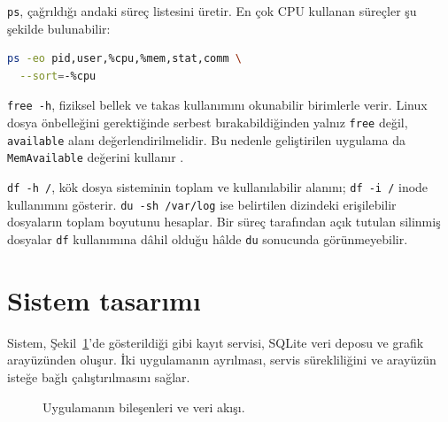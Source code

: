 \documentclass[9pt,a4paper,twocolumn]{extarticle}
\begin{document}
\texttt{ps}, çağrıldığı andaki süreç listesini üretir. En çok CPU kullanan süreçler şu şekilde bulunabilir:

\begin{lstlisting}[language=bash]
ps -eo pid,user,%cpu,%mem,stat,comm \
  --sort=-%cpu
\end{lstlisting}

\texttt{free -h}, fiziksel bellek ve takas kullanımını okunabilir birimlerle verir. Linux dosya önbelleğini gerektiğinde serbest bırakabildiğinden yalnız \texttt{free} değil, \texttt{available} alanı değerlendirilmelidir. Bu nedenle geliştirilen uygulama da \texttt{MemAvailable} değerini kullanır \cite{procman}.

\texttt{df -h /}, kök dosya sisteminin toplam ve kullanılabilir alanını; \texttt{df -i /} inode kullanımını gösterir. \texttt{du -sh /var/log} ise belirtilen dizindeki erişilebilir dosyaların toplam boyutunu hesaplar. Bir süreç tarafından açık tutulan silinmiş dosyalar \texttt{df} kullanımına dâhil olduğu hâlde \texttt{du} sonucunda görünmeyebilir.

\section{Sistem tasarımı}

Sistem, Şekil~\ref{fig:mimari}'de gösterildiği gibi kayıt servisi, SQLite veri deposu ve grafik arayüzünden oluşur. İki uygulamanın ayrılması, servis sürekliliğini ve arayüzün isteğe bağlı çalıştırılmasını sağlar.

\begin{figure}[ht]
\centering
{}
\caption{Uygulamanın bileşenleri ve veri akışı.}
\label{fig:mimari}
\end{figure}
\end{document}
